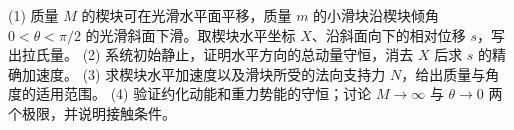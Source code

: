 (1) 质量 \(M\) 的楔块可在光滑水平面平移，质量 \(m\) 的小滑块沿楔块倾角 \(0<\theta<\pi/2\) 的光滑斜面下滑。取楔块水平坐标 \(X\)、沿斜面向下的相对位移 \(s\)，写出拉氏量。
(2) 系统初始静止，证明水平方向的总动量守恒，消去 \(X\) 后求 \(s\) 的精确加速度。
(3) 求楔块水平加速度以及滑块所受的法向支持力 \(N\)，给出质量与角度的适用范围。
(4) 验证约化动能和重力势能的守恒；讨论 \(M\to\infty\) 与 \(\theta\to0\) 两个极限，并说明接触条件。
